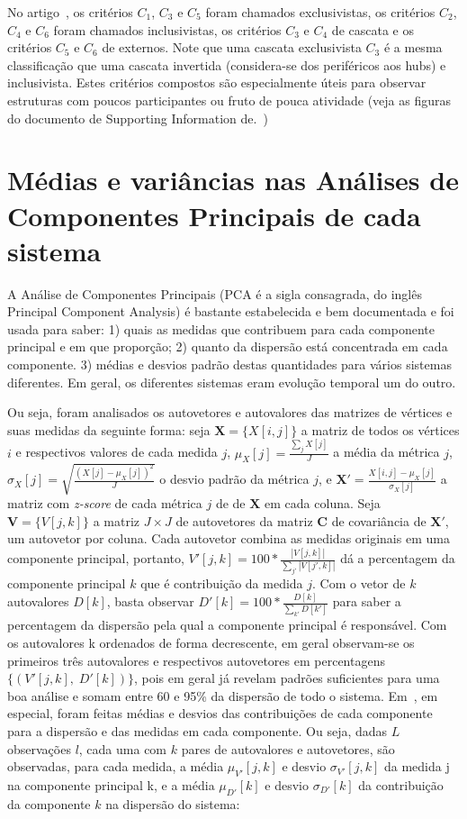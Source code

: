 \documentclass[a4paper,openright,12pt]{report} %
\begin{document}
No artigo~\cite{timeS}, os critérios $C_1$, $C_3$ e $C_5$ foram chamados exclusivistas,
os critérios $C_2$, $C_4$ e $C_6$ foram chamados inclusivistas,
os critérios $C_3$ e $C_4$ de cascata e os critérios $C_5$ e $C_6$ de externos. Note que uma cascata exclusivista $C_3$ é a mesma classificação que uma cascata invertida (considera-se dos periféricos aos hubs) e inclusivista. Estes critérios compostos são especialmente úteis para observar estruturas com poucos participantes ou fruto de pouca atividade (veja as figuras do documento de Supporting Information de.~\cite{timeS})

\section{Médias e variâncias nas Análises de Componentes Principais de cada sistema}\label{sec:pca}
A Análise de Componentes Principais (PCA é a sigla consagrada, do inglês Principal Component Analysis) é bastante estabelecida e bem documentada
e foi usada para saber: 
1) quais as medidas que contribuem para cada componente principal e em que proporção;
2) quanto da dispersão está concentrada em cada componente.
3) médias e desvios padrão destas quantidades para vários
sistemas diferentes. Em geral, os diferentes sistemas eram evolução
temporal um do outro.

Ou seja, foram analisados os autovetores e autovalores das matrizes
de vértices e suas medidas da seguinte forma: seja $\mathbf{X}=\{X[i,j]\}$
a matriz de todos os vértices $i$ e respectivos valores de cada medida $j$, 
$\mu_X [j]=\frac{\sum_j X[j]}{J}$ a média da métrica $j$, 
$\sigma_X [j]=\sqrt{\frac{(X[j]-\mu_X [j])^2}{J}}$ o desvio padrão da métrica $j$,
e $\mathbf{X'}={\frac{X[i,j]-\mu_X[j]}{\sigma_X[j]}}$ a matriz com \emph{z-score} de cada métrica $j$ de de $\mathbf{X}$ em cada coluna. 
Seja $\mathbf{V}=\{V[j,k]\}$ a matriz $J\times J$ de autovetores da matriz $\mathbf{C}$ de covariância
de $\mathbf{X'}$, um autovetor por coluna.
Cada autovetor combina as medidas originais em uma componente principal, portanto, $V'[j,k]=100*\frac{|V[j,k]|}{\sum_{j'} |V[j',k]|}$
dá a percentagem da componente principal $k$
que é contribuição da medida $j$.
Com o vetor de $k$ autovalores $D[k]$,
basta observar $D'[k]=100*\frac{D[k]}{\sum_{k'}D[k']}$ para saber
a percentagem da dispersão pela qual a componente principal é responsável.
Com os autovalores k ordenados de forma decrescente, 
em geral observam-se os primeiros três autovalores e respectivos
autovetores em percentagens $\{(V'[j,k],\;D'[k])\}$, pois em geral
já revelam padrões suficientes para uma boa análise e somam entre 60 e 95\% da dispersão de todo o sistema.
Em~\cite{timeS}, em especial, foram feitas médias e desvios das contribuições de cada componente para a dispersão e das medidas em cada componente. Ou seja, dadas $L$ observações $l$, cada uma com $k$ pares de autovalores e autovetores, são observadas, para cada medida,
a média $\mu_{V'}[j,k]$ e desvio $\sigma_{V'}[j,k]$ 
da medida j na componente principal k,
e a média $\mu_{D'}[k]$ e desvio $\sigma_{D'}[k]$ da 
contribuição da componente $k$ na dispersão do sistema:
\end{document}
